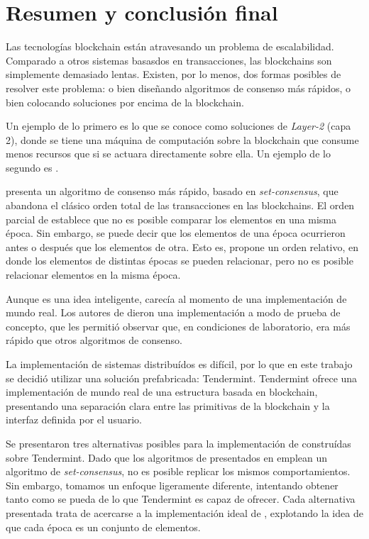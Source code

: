 \section{Resumen y conclusión final}\label{sec:conclusion}
%
Las tecnologías blockchain están atravesando un problema de escalabilidad.
%
Comparado a otros sistemas basasdos en transacciones, las blockchains son simplemente
demasiado lentas.
%
Existen, por lo menos, dos formas posibles de resolver este problema: o bien
diseñando algoritmos de consenso más rápidos, o bien colocando soluciones por
encima de la blockchain.

%
Un ejemplo de lo primero es lo que se conoce como soluciones de \emph{Layer-2}
(capa 2),
donde se tiene una máquina de computación sobre la blockchain que consume menos
recursos que si se actuara directamente sobre ella.
%
Un ejemplo de lo segundo es \setchain.

\setchain presenta un algoritmo de consenso más rápido, basado en
\textit{set-consensus}\cite{redbelly},
que abandona el clásico orden total de las transacciones en las blockchains.
%
El orden parcial de \setchain establece que no es posible comparar los elementos
en una misma época.
%
Sin embargo, se puede decir que los elementos de una época ocurrieron antes o después
que los elementos de otra.
%
Esto es, \setchain propone un orden relativo, en donde los elementos
de distintas épocas se pueden relacionar, pero no es posible relacionar elementos
en la misma época.

Aunque \setchain es una idea inteligente, carecía al momento de una implementación
de mundo real.
%
Los autores de \setchain dieron una implementación a modo de prueba de concepto,
que les permitió observar que, en condiciones de laboratorio,
era más rápido que otros algoritmos de consenso.
%

La implementación de sistemas distribuídos es difícil, por lo que en este trabajo
se decidió utilizar una solución prefabricada: Tendermint.
Tendermint ofrece una implementación
de mundo real de una estructura basada en blockchain, presentando una separación clara
entre las primitivas de la blockchain y la interfaz definida por el usuario.


Se presentaron tres alternativas posibles para la implementación
de \setchain construídas sobre Tendermint. Dado que los algoritmos de \setchain
presentados en \cite{Capretto.2022.Setchain} emplean un algoritmo de
\textit{set-consensus}, 
no es posible replicar los mismos comportamientos.
Sin embargo, tomamos un enfoque ligeramente diferente,
intentando obtener tanto como se pueda de lo que Tendermint es capaz de ofrecer.
Cada alternativa presentada trata de acercarse a la implementación ideal de \setchain,
explotando la idea de que cada época es un conjunto de elementos.

